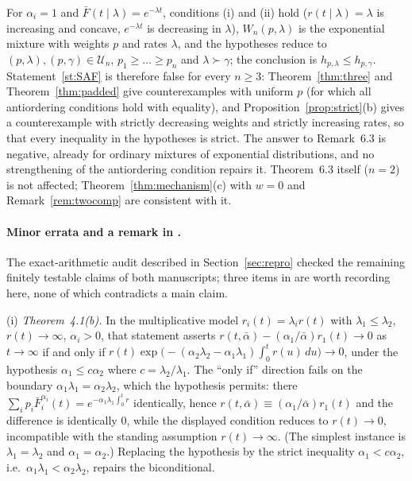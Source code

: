 \documentclass[10pt]{article}
\theoremstyle{plain}
\theoremstyle{definition}
\theoremstyle{remark}
\begin{document}
For $\alpha_i=1$ and $\bar F(t\mid\lambda)=e^{-\lambda t}$, conditions (i) and (ii) hold ($r(t\mid\lambda)=\lambda$ is increasing and concave, $e^{-\lambda t}$ is decreasing in $\lambda$), $W_n(p,\lambda)$ is the exponential mixture with weights $p$ and rates $\lambda$, and the hypotheses reduce to $(p,\lambda),(p,\gamma)\in\mathcal U_n$, $p_1\ge\dots\ge p_n$ and $\lambda\succ\gamma$; the conclusion is $h_{p,\lambda}\le h_{p,\gamma}$. Statement~\ref{st:SAF} is therefore false for every $n\ge 3$: Theorem~\ref{thm:three} and Theorem~\ref{thm:padded} give counterexamples with uniform $p$ (for which all antiordering conditions hold with equality), and Proposition~\ref{prop:strict}(b) gives a counterexample with strictly decreasing weights and strictly increasing rates, so that every inequality in the hypotheses is strict. The answer to Remark~6.3 is negative, already for ordinary mixtures of exponential distributions, and no strengthening of the antiordering condition repairs it. Theorem~6.3 itself ($n=2$) is not affected; Theorem~\ref{thm:mechanism}(c) with $w=0$ and Remark~\ref{rem:twocomp} are consistent with it.

\paragraph{Minor errata and a remark in \cite{ShojaeeAsadiFinkelstein2022}.} The exact-arithmetic audit described in Section~\ref{sec:repro} checked the remaining finitely testable claims of both manuscripts; three items in \cite{ShojaeeAsadiFinkelstein2022} are worth recording here, none of which contradicts a main claim.

(i) \emph{Theorem~4.1(b).} In the multiplicative model $r_i(t)=\lambda_i r(t)$ with $\lambda_1\le\lambda_2$, $r(t)\to\infty$, $\alpha_i>0$, that statement asserts $r(t,\bar\alpha)-(\alpha_1/\bar\alpha)r_1(t)\to0$ as $t\to\infty$ if and only if $r(t)\exp\bigl(-(\alpha_2\lambda_2-\alpha_1\lambda_1)\int_0^t r(u)\,du\bigr)\to0$, under the hypothesis $\alpha_1\le c\alpha_2$ where $c=\lambda_2/\lambda_1$. The ``only if'' direction fails on the boundary $\alpha_1\lambda_1=\alpha_2\lambda_2$, which the hypothesis permits: there $\sum_i p_i\bar F_i^{\alpha_i}(t)=e^{-\alpha_1\lambda_1\int_0^tr}$ identically, hence $r(t,\bar\alpha)\equiv(\alpha_1/\bar\alpha)r_1(t)$ and the difference is identically $0$, while the displayed condition reduces to $r(t)\to0$, incompatible with the standing assumption $r(t)\to\infty$. (The simplest instance is $\lambda_1=\lambda_2$ and $\alpha_1=\alpha_2$.) Replacing the hypothesis by the strict inequality $\alpha_1<c\alpha_2$, i.e.\ $\alpha_1\lambda_1<\alpha_2\lambda_2$, repairs the biconditional.
\end{document}
